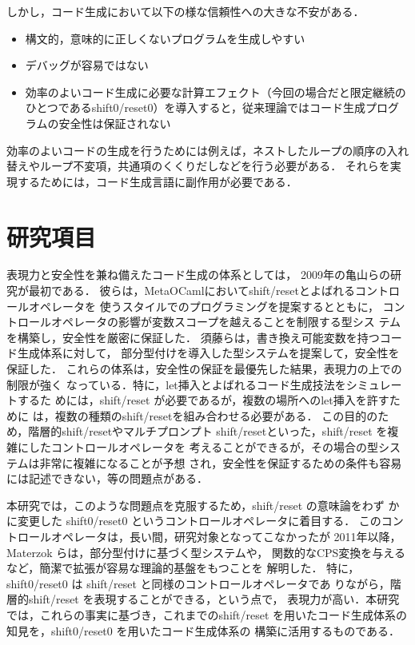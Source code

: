 \documentclass[T]{compsoft}
\theoremstyle{break}
\begin{document}
しかし，コード生成において以下の様な信頼性への大きな不安がある．

\begin{itemize}
\item 構文的，意味的に正しくないプログラムを生成しやすい
\item デバッグが容易ではない
\item 効率のよいコード生成に必要な計算エフェクト（今回の場合だと限定継続のひとつであるshift0/reset0）を導入すると，従来理論ではコード生成プログラムの安全性は保証されない
\end{itemize}

効率のよいコードの生成を行うためには例えば，ネストしたループの順序の入れ替えやループ不変項，共通項のくくりだしなどを行う必要がある．
それらを実現するためには，コード生成言語に副作用が必要である．

\section{研究項目}
表現力と安全性を兼ね備えたコード生成の体系としては，
2009年の亀山らの研究\cite{Kameyama2009}が最初である．
彼らは，MetaOCamlにおいてshift/resetとよばれるコントロールオペレータを
使うスタイルでのプログラミングを提案するとともに，
コントロールオペレータの影響が変数スコープを越えることを制限する型シス
テムを構築し，安全性を厳密に保証した．
須藤ら\cite{Sudo2014}は，書き換え可能変数を持つコード生成体系に対して，
部分型付けを導入した型システムを提案して，安全性を保証した．
これらの体系は，安全性の保証を最優先した結果，表現力の上での制限が強く
なっている．特に，let挿入とよばれるコード生成技法をシミュレートするた
めには，shift/reset が必要であるが，複数の場所へのlet挿入を許すために
は，複数の種類のshift/resetを組み合わせる必要がある．
この目的のため，階層的shift/resetやマルチプロンプト
shift/resetといった，shift/reset を複雑にしたコントロールオペレータを
考えることができるが，その場合の型システムは非常に複雑になることが予想
され，安全性を保証するための条件も容易には記述できない，等の問題点がある．

本研究では，このような問題点を克服するため，shift/reset の意味論をわず
かに変更した shift0/reset0 というコントロールオペレータに着目する．
このコントロールオペレータは，長い間，研究対象となってこなかったが
2011年以降，Materzok らは，部分型付けに基づく型システムや，
関数的なCPS変換を与えるなど，簡潔で拡張が容易な理論的基盤をもつことを
解明した\cite{Materzok2011,materzok2012}．
特に，shift0/reset0 は shift/reset と同様のコントロールオペレータであ
りながら，階層的shift/reset を表現することができる，という点で，
表現力が高い．本研究では，これらの事実に基づき，これまでのshift/reset
を用いたコード生成体系の知見を，shift0/reset0 を用いたコード生成体系の
構築に活用するものである．
\end{document}
